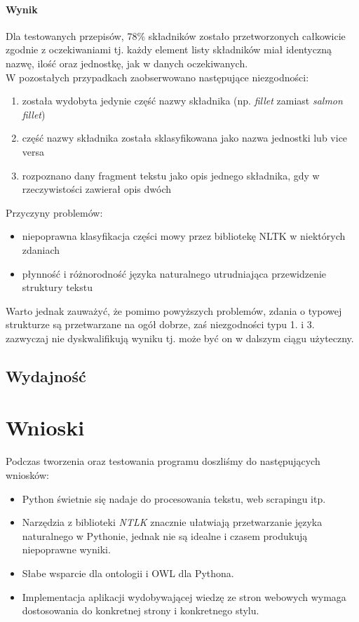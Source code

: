 \documentclass[11pt,a4paper]{article}
\begin{document}
\paragraph{Wynik} 
Dla testowanych przepisów, 78\% składników zostało przetworzonych całkowicie zgodnie z oczekiwaniami tj. każdy element listy składników miał identyczną nazwę, ilość oraz jednostkę, jak w danych oczekiwanych.\\
W pozostałych przypadkach zaobserwowano następujące niezgodności:
\begin{enumerate}
\item została wydobyta jedynie część nazwy składnika (np. \textit{fillet} zamiast \textit{salmon fillet})
\item część nazwy składnika została sklasyfikowana jako nazwa jednostki lub vice versa
\item rozpoznano dany fragment tekstu jako opis jednego składnika, gdy w rzeczywistości zawierał opis dwóch
\end{enumerate}
Przyczyny problemów:
\begin{itemize}
\item niepoprawna klasyfikacja części mowy przez bibliotekę NLTK w niektórych zdaniach
\item płynność i różnorodność języka naturalnego utrudniająca przewidzenie struktury tekstu
\end{itemize}
Warto jednak zauważyć, że pomimo powyższych problemów, zdania o typowej strukturze są przetwarzane na ogół dobrze, zaś niezgodności typu 1. i 3. zazwyczaj nie dyskwalifikują wyniku tj. może być on w dalszym ciągu użyteczny.

\subsection{Wydajność}


\newpage
\section{Wnioski}
Podczas tworzenia oraz testowania programu doszliśmy do następujących wniosków:

\begin{itemize}
  \item Python świetnie się nadaje do procesowania tekstu, web scrapingu itp.
  \item Narzędzia z biblioteki \textit{NTLK} znacznie ułatwiają przetwarzanie języka naturalnego w Pythonie, jednak nie są idealne i czasem produkują niepoprawne wyniki.
  \item Słabe wsparcie dla ontologii i OWL dla Pythona.
  \item Implementacja aplikacji wydobywającej wiedzę ze stron webowych wymaga dostosowania do konkretnej strony i konkretnego stylu.
\end{itemize}
\end{document}
